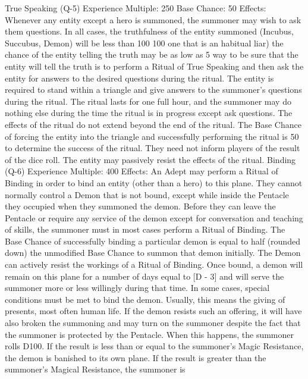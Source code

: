 \documentclass[a4paper]{article}
\begin{document}
\begin{multicols}{3}
True Speaking (Q-5)
Experience Multiple: 250
Base Chance: 50%
Effects: Whenever any entity except a hero is
summoned, the summoner may wish to ask them
questions. In all cases, the truthfulness of the entity
summoned (Incubus, Succubus, Demon) will be
less than 100%
100%
one that is an habitual liar) the chance of the entity
telling the truth may be as low as 5%
way to be sure that the entity will tell the truth is to
perform a Ritual of True Speaking and then ask the
entity for answers to the desired questions during
the ritual. The entity is required to stand within a
triangle and give answers to the summoner’s questions during the ritual. The ritual lasts for one full
hour, and the summoner may do nothing else during the time the ritual is in progress except ask
questions. The effects of the ritual do not extend
beyond the end of the ritual. The Base Chance of
forcing the entity into the triangle and successfully
performing the ritual is 50%
to determine the success of the ritual. They need
not inform players of the result of the dice roll. The
entity may passively resist the effects of the ritual.
Binding (Q-6)
Experience Multiple: 400
Effects: An Adept may perform a Ritual of Binding
in order to bind an entity (other than a hero) to this
plane. They cannot normally control a Demon that
is not bound, except while inside the Pentacle they
occupied when they summoned the demon. Before
they can leave the Pentacle or require any service
of the demon except for conversation and teaching
of skills, the summoner must in most cases perform
a Ritual of Binding. The Base Chance of successfully binding a particular demon is equal to half
(rounded down) the unmodified Base Chance to
summon that demon initially. The Demon can
actively resist the workings of a Ritual of Binding.
Once bound, a demon will remain on this plane for
a number of days equal to [D - 3] and will serve the
summoner more or less willingly during that time.
In some cases, special conditions must be met to
bind the demon. Usually, this means the giving of
presents, most often human life. If the demon
resists such an offering, it will have also broken the
summoning and may turn on the summoner despite
the fact that the summoner is protected by the
Pentacle. When this happens, the summoner rolls
D100. If the result is less than or equal to the summoner’s Magic Resistance, the demon is banished
to its own plane. If the result is greater than the
summoner’s Magical Resistance, the summoner is

\end{multicols}
\end{document}
